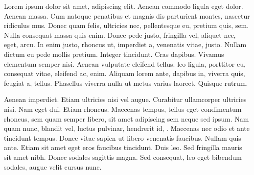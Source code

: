 \documentclass[twoside,12pt,a4paper]{scrbook}
\begin{document}
\begin{pages}

  \begin{Leftside}
    \beginnumbering\pstart
    Lorem ipsum dolor sit amet,
     adipiscing elit.
    Aenean commodo ligula eget dolor. Aenean massa. Cum
     natoque penatibus et magnis dis
    parturient montes, nascetur ridiculus mus. Donec quam felis, ultricies
    nec, pellentesque eu, pretium quis, sem. Nulla consequat massa quis
    enim. Donec pede justo, fringilla vel, aliquet nec,
     eget, arcu. In enim justo,
    rhoncus ut, imperdiet a, venenatis vitae, justo. Nullam dictum
     eu pede mollis pretium. Integer
    tincidunt. Cras dapibus. Vivamus elementum semper nisi. Aenean
    vulputate eleifend tellus.  leo
    ligula, porttitor eu, consequat vitae, eleifend ac, enim. Aliquam lorem
    ante, dapibus in, viverra quis, feugiat a, tellus. Phasellus viverra
    nulla ut metus varius laoreet. Quisque rutrum.

    Aenean imperdiet. Etiam ultricies nisi vel augue. Curabitur ullamcorper
    ultricies nisi. Nam eget dui. Etiam rhoncus. Maecenas tempus, tellus
    eget condimentum rhoncus, sem quam semper libero, sit amet adipiscing sem
    neque sed ipsum. Nam quam nunc, blandit vel, luctus pulvinar, hendrerit id,
    . Maecenas nec odio et ante
    tincidunt tempus. Donec vitae sapien ut libero venenatis faucibus.
    Nullam quis ante. Etiam sit amet  eget
    eros faucibus tincidunt. Duis leo. Sed fringilla mauris sit amet nibh.
    Donec sodales sagittis magna. Sed consequat, leo eget bibendum sodales,
    augue velit cursus nunc.
    \pend\endnumbering
  \end{Leftside}


\end{pages}
\end{document}
